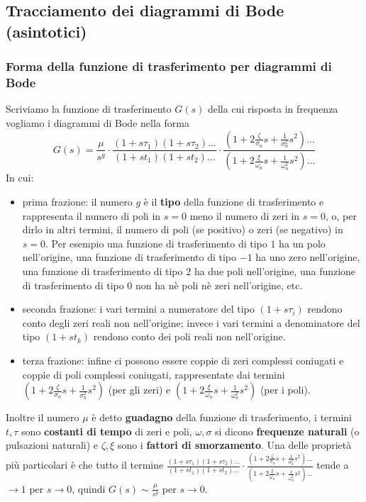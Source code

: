 \subsection{Tracciamento dei diagrammi di Bode (asintotici)}
\subsubsection{Forma della funzione di trasferimento per diagrammi di Bode}
Scriviamo la funzione di trasferimento $G(s)$ della cui risposta in frequenza vogliamo i diagrammi di Bode nella forma 
\[
    G(s) = \frac{\mu}{s^g} \cdot \frac{(1 + s \tau_1)(1 + s \tau_2)\dots}{(1 + s t_1)(1 + s t_2)\dots} \cdot \frac{(1 + 2 \frac{\zeta}{\sigma_n}s + \frac{1}{\sigma_n^2}s^2)\dots}{(1 + 2 \frac{\xi}{\omega_n} s + \frac{1}{\omega_n^2}s^2)\dots}
\]
In cui:
\begin{itemize}
    \item prima frazione: il numero $g$ è il \textbf{tipo} della funzione di trasferimento e rappresenta il numero di poli in $s=0$ meno il numero di zeri in $s=0$, o, per dirlo in altri termini, il numero di poli (se positivo) o zeri (se negativo) in $s=0$.\newline
    Per esempio una funzione di trasferimento di tipo $1$ ha un polo nell'origine, una funzione di trasferimento di tipo $-1$ ha uno zero nell'origine, una funzione di trasferimento di tipo $2$ ha due poli nell'origine, una funzione di trasferimento di tipo $0$ non ha nè poli nè zeri nell'origine, etc.
    \item seconda frazione: i vari termini a numeratore del tipo $(1 + s \tau_i)$ rendono conto degli zeri reali non nell'origine; invece i vari termini a denominatore del tipo $(1 + s t_k)$ rendono conto dei poli reali non nell'origine.
    \item terza frazione: infine ci possono essere coppie di zeri complessi coniugati e coppie di poli complessi coniugati, rappresentate dai termini $(1 + 2 \frac{\zeta}{\sigma_n}s + \frac{1}{\sigma_n^2}s^2)$ (per gli zeri) e $(1 + 2 \frac{\xi}{\omega_n} s + \frac{1}{\omega_n^2}s^2)$ (per i poli).
\end{itemize}
Inoltre il numero $\mu$ è detto \textbf{guadagno} della funzione di trasferimento, i termini $t, \tau$ sono \textbf{costanti di tempo} di zeri e poli,  $\omega, \sigma$ si dicono \textbf{frequenze naturali} (o pulsazioni naturali) e $\zeta, \xi$ sono i \textbf{fattori di smorzamento}.\newline
\newline
Una delle proprietà più particolari è che tutto il termine $\frac{(1 + s \tau_1)(1 + s \tau_2)\dots}{(1 + s t_1)(1 + s t_2)\dots} \cdot \frac{(1 + 2 \frac{\zeta}{\sigma_n}s + \frac{1}{\sigma_n^2}s^2)\dots}{(1 + 2 \frac{\xi}{\omega_n} s + \frac{1}{\omega_n^2}s^2)\dots}$ tende a $\rightarrow  1$ per $s \rightarrow 0$, quindi $G(s) \sim \frac{\mu}{s^g}$ per $s \rightarrow  0$.\newline
